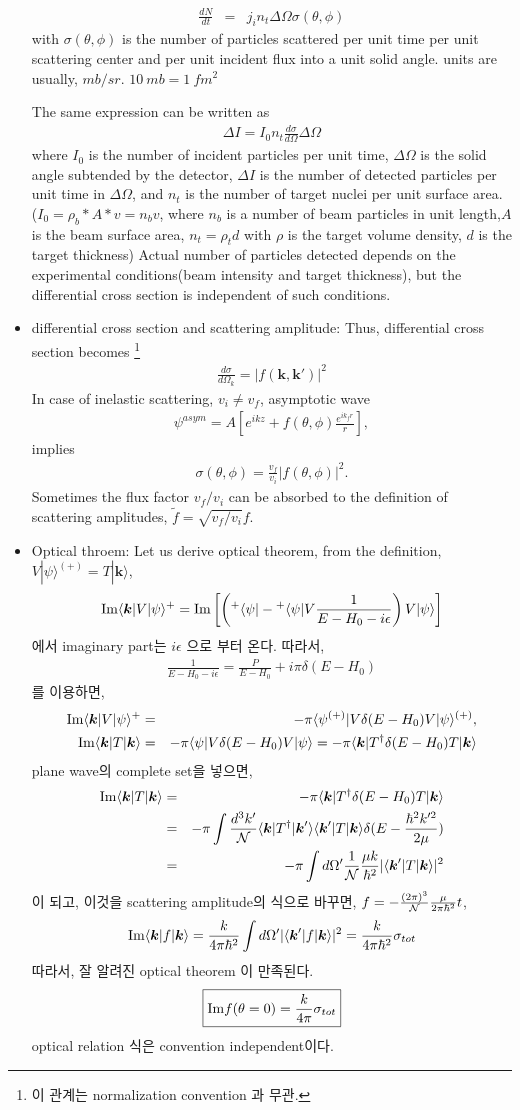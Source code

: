 \documentclass[10pt]{book}
\def\bm{\boldsymbol}
\newcommand{\bea}{\begin{eqnarray}}
\newcommand{\eea}{\end{eqnarray}}
\newcommand{\no}{\nonumber \\}
\def\vk{{\bm k}}
\def\la{\langle}
\def\ra{\rangle}
\begin{document}
\begin{itemize}
{      \bea   
\frac{dN}{dt}&=&j_i n_t\Delta\Omega\sigma(\theta,\phi)
\eea
with $\sigma(\theta,\phi)$ is the number of particles scattered 
per unit time per unit scattering center and per unit incident flux
into a unit solid angle. units are usually, $mb/sr$. $10\ mb=1\ fm^2$

The same expression can be written as
\bea 
\Delta I = I_0 n_t \frac{d\sigma}{d\Omega}\Delta \Omega 
\eea 
where $I_0$ is the number of incident particles per unit time,
$\Delta\Omega$ is the solid angle subtended by the detector, $\Delta I$ is the number of
detected particles per unit time in $\Delta\Omega$, and $n_t$ is the number of target nuclei per unit surface area.
($I_0=\rho_b*A*v =n_b v $, where $n_b$ is a number of beam particles in unit length,$A$ is the beam surface area,   
$n_t=\rho_t d$ with $\rho$ is the target volume density, $d$ is the target thickness)
Actual number of particles detected depends on the experimental conditions(beam intensity and target thickness),
but the differential cross section is independent of such conditions. 
}

\item differential cross section and scattering amplitude:
Thus,
differential cross section becomes 
\footnote{
이 관계는 normalization convention 과 무관.}
\bea
\frac{d\sigma}{d\Omega_k}=|f(\vk,\vk')|^2
\eea
In case of inelastic scattering, $v_i\neq v_f$, asymptotic wave
\bea
\psi^{asym}=A[e^{ikz}+f(\theta,\phi)\frac{e^{ik_f r}}{r}],
\eea
implies
\bea
\sigma(\theta,\phi)=\frac{v_f}{v_i}|f(\theta,\phi)|^2.
\eea
Sometimes the flux factor $v_f/v_i$ can be absorbed to 
the definition of scattering amplitudes, $\tilde{f}=\sqrt{v_f/v_i} f$.



\item Optical throem: 
Let us derive optical theorem, from the definition,
$V|\psi\ra^{(+)}=T|\vk\ra$,
\bea
{\rm Im}\la \vk|V|\psi\ra^+={\rm Im}\left[
\left({}^+\la\psi|-{}^+\la\psi|V\frac{1}{E-H_0-i\epsilon}\right)V|\psi\ra
\right]
\eea
에서 imaginary part는 $i\epsilon$ 으로 부터 온다. 따라서,
\bea
\frac{1}{E-H_0-i\epsilon}=\frac{P}{E-H_0}+i\pi\delta(E-H_0)
\eea 
를 이용하면,
\bea
{\rm Im}\la \vk|V|\psi\ra^+
&=&-\pi{}\la\psi^{(+)}|V\delta(E-H_0)V|\psi\ra^{(+)},\no
{\rm Im}\la \vk|T|\vk\ra
&=&-\pi\la\psi|V\delta(E-H_0)V|\psi\ra
   =-\pi\la\vk|T^\dagger\delta(E-H_0)T|\vk\ra
\eea
plane wave의 complete set을 넣으면,
\bea
{\rm Im}\la \vk|T|\vk\ra
&=&-\pi\la\vk|T^\dagger\delta(E-H_0)T|\vk\ra\no
&=&-\pi\int \frac{d^3k'}{\cal N}
   \la \vk|T^\dagger|\vk'\ra 
   \la \vk'|T|\vk\ra
   \delta(E-\frac{\hbar^2 k'^2}{2\mu})\no 
 &=&-\pi\int d\Omega' \frac{1}{\cal N} 
    \frac{\mu k}{\hbar^2}|\la \vk'|T|\vk\ra|^2
\eea
이 되고, 이것을 scattering amplitude의 식으로 바꾸면,
$f=-\frac{(2\pi)^3}{\cal N}\frac{\mu}{2\pi\hbar^2} t$,
\bea
{\rm Im}\la \vk|f|\vk\ra
=\frac{k}{4\pi\hbar^2}\int d\Omega'
 |\la \vk'|f|\vk\ra|^2 
= \frac{k}{4\pi\hbar^2} \sigma_{tot}
\eea
따라서, 잘 알려진 optical theorem 이 만족된다.
\bea
\boxed{
{\rm Im}f(\theta=0)=\frac{k}{4\pi}\sigma_{tot}}
\eea
 optical relation 식은 convention independent이다.
\end{itemize}
\end{document}
